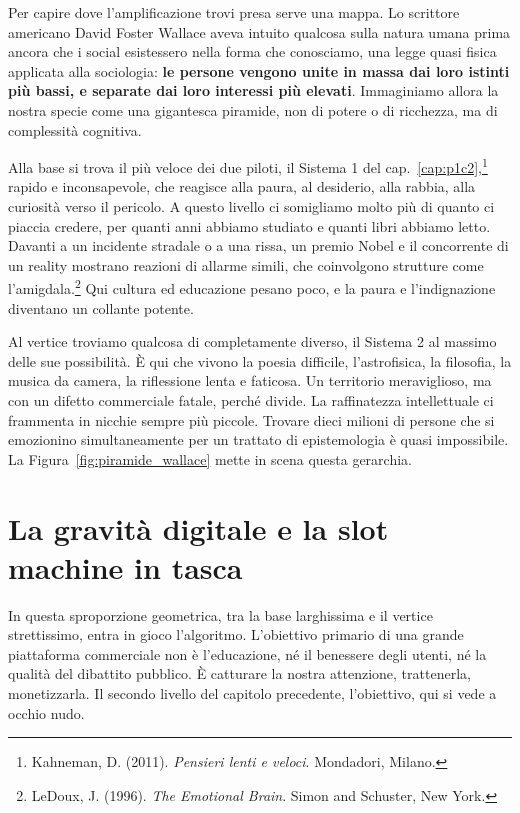 Per capire dove l'amplificazione trovi presa serve una mappa. Lo scrittore americano David Foster Wallace aveva intuito qualcosa sulla natura umana prima ancora che i social esistessero nella forma che conosciamo, una legge quasi fisica applicata alla sociologia: \textbf{le persone vengono unite in massa dai loro istinti più bassi, e separate dai loro interessi più elevati}. Immaginiamo allora la nostra specie come una gigantesca piramide, non di potere o di ricchezza, ma di complessità cognitiva.

Alla base si trova il più veloce dei due piloti, il Sistema 1 del cap.~\ref{cap:p1c2},\footnote{Kahneman, D. (2011). \textit{Pensieri lenti e veloci}. Mondadori, Milano.} rapido e inconsapevole, che reagisce alla paura, al desiderio, alla rabbia, alla curiosità verso il pericolo. A questo livello ci somigliamo molto più di quanto ci piaccia credere, per quanti anni abbiamo studiato e quanti libri abbiamo letto. Davanti a un incidente stradale o a una rissa, un premio Nobel e il concorrente di un reality mostrano reazioni di allarme simili, che coinvolgono strutture come l'amigdala.\footnote{LeDoux, J. (1996). \textit{The Emotional Brain}. Simon and Schuster, New York.} Qui cultura ed educazione pesano poco, e la paura e l'indignazione diventano un collante potente.

Al vertice troviamo qualcosa di completamente diverso, il Sistema 2 al massimo delle sue possibilità. È qui che vivono la poesia difficile, l'astrofisica, la filosofia, la musica da camera, la riflessione lenta e faticosa. Un territorio meraviglioso, ma con un difetto commerciale fatale, perché divide. La raffinatezza intellettuale ci frammenta in nicchie sempre più piccole. Trovare dieci milioni di persone che si emozionino simultaneamente per un trattato di epistemologia è quasi impossibile. La Figura~\ref{fig:piramide_wallace} mette in scena questa gerarchia.


\section{La gravità digitale e la slot machine in tasca}

In questa sproporzione geometrica, tra la base larghissima e il vertice strettissimo, entra in gioco l'algoritmo. L'obiettivo primario di una grande piattaforma commerciale non è l'educazione, né il benessere degli utenti, né la qualità del dibattito pubblico. È catturare la nostra attenzione, trattenerla, monetizzarla. Il secondo livello del capitolo precedente, l'obiettivo, qui si vede a occhio nudo.

